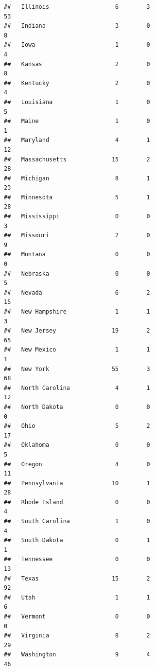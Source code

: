 \documentclass[]{book}
\theoremstyle{definition}
\theoremstyle{definition}
\theoremstyle{definition}
\theoremstyle{remark}
\begin{document}
\begin{verbatim}
##   Illinois                   6        3                              53
##   Indiana                    3        0                               8
##   Iowa                       1        0                               4
##   Kansas                     2        0                               8
##   Kentucky                   2        0                               4
##   Louisiana                  1        0                               5
##   Maine                      1        0                               1
##   Maryland                   4        1                              12
##   Massachusetts             15        2                              28
##   Michigan                   8        1                              23
##   Minnesota                  5        1                              28
##   Mississippi                0        0                               3
##   Missouri                   2        0                               9
##   Montana                    0        0                               0
##   Nebraska                   0        0                               5
##   Nevada                     6        2                              15
##   New Hampshire              1        1                               3
##   New Jersey                19        2                              65
##   New Mexico                 1        1                               1
##   New York                  55        3                              68
##   North Carolina             4        1                              12
##   North Dakota               0        0                               0
##   Ohio                       5        2                              17
##   Oklahoma                   0        0                               5
##   Oregon                     4        0                              11
##   Pennsylvania              10        1                              28
##   Rhode Island               0        0                               4
##   South Carolina             1        0                               4
##   South Dakota               0        1                               1
##   Tennessee                  0        0                              13
##   Texas                     15        2                              92
##   Utah                       1        1                               6
##   Vermont                    0        0                               0
##   Virginia                   8        2                              29
##   Washington                 9        4                              46

\end{verbatim}
\end{document}

